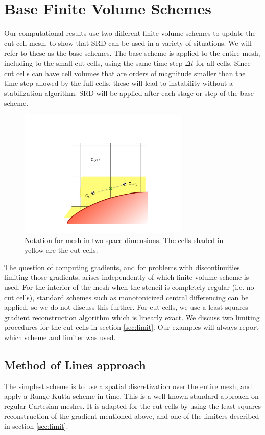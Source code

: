 \section{Base Finite Volume Schemes}\label{sec:basefv}

Our computational results use two different finite volume schemes
to update the cut cell mesh, to show that SRD can be used in a
variety of situations.
We will refer to these as the base schemes. 
The  base scheme is applied to the entire mesh, including  
to the small cut cells, using the same time step $\Delta t$ for all cells.  
Since cut cells can have cell volumes that are
orders of magnitude smaller than the time step allowed by the full
cells, these will lead to instability without a stabilization algorithm.
SRD will be applied after each stage or step of the base scheme.

\begin{figure}
\begin{center}
\includegraphics[width=3.2in]{figs/2dfig.pdf}
\caption{\sf Notation for mesh in two space dimensions. The cells shaded
in yellow are the cut cells.} 
\label{fig:2dfig}
\end{center}
\end{figure}

The question of computing gradients, and for problems with discontinuities limiting
those gradients, arises independently of which finite volume scheme is used. 
For the interior of the mesh when the stencil is completely regular (i.e. no cut
cells), standard schemes such as monotonicized central differencing can be 
applied, so we do not discuss this further.
For cut cells, we use a least squares gradient reconstruction algorithm which is
linearly exact.  We discuss two  limiting procedures for the cut cells in 
section \ref{sec:limit}. Our examples will always report which scheme and
limiter was used.


\subsection{Method of Lines approach}
The simplest scheme is to use a spatial discretization over the entire
mesh, and apply a Runge-Kutta scheme in time. This is a well-known
standard approach
on regular Cartesian meshes. It is adapted for the cut cells by
using the  least squares reconstruction of the gradient mentioned above, and one of
the limiters described in section \ref{sec:limit}.

